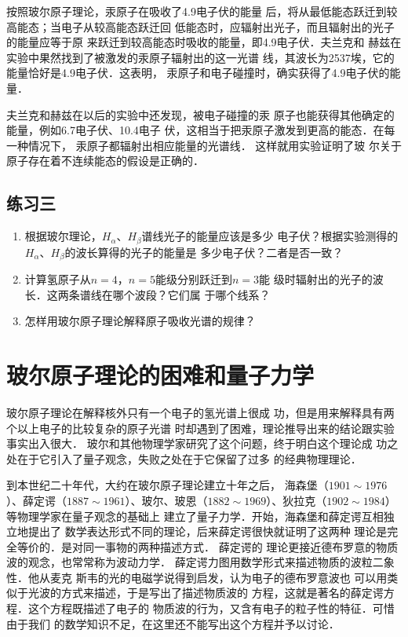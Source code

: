按照玻尔原子理论，汞原子在吸收了4.9电子伏的能量
后，将从最低能态跃迁到较高能态；当电子从较高能态跃迁回
低能态时，应辐射出光子，而且辐射出的光子的能量应等于原
来跃迁到较高能态时吸收的能量，即4.9电子伏．夫兰克和
赫兹在实验中果然找到了被激发的汞原子辐射出的这一光谱
线，其波长为2537埃，它的能量恰好是4.9电子伏．这表明，
汞原子和电子碰撞时，确实获得了4.9电子伏的能量．

夫兰克和赫兹在以后的实验中还发现，被电子碰撞的汞
原子也能获得其他确定的能量，例如6.7电子伏、10.4电子
伏，这相当于把汞原子激发到更高的能态．在每一种情况下，
汞原子都辐射出相应能量的光谱线．
这样就用实验证明了玻
尔关于原子存在着不连续能态的假设是正确的．


\subsection*{练习三}
\begin{enumerate}
    \item 根据玻尔理论，$H_{\alpha}$、$H_{\beta}$谱线光子的能量应该是多少
电子伏？根据实验测得的$H_{\alpha}$、$H_{\beta}$的波长算得的光子的能量是
多少电子伏？二者是否一致？
\item 计算氢原子从$n=4$，$n=5$能级分别跃迁到$n=3$能
级时辐射出的光子的波长．这两条谱线在哪个波段？它们属
于哪个线系？
\item 怎样用玻尔原子理论解释原子吸收光谱的规律？
\end{enumerate}


\section{玻尔原子理论的困难和量子力学}

玻尔原子理论在解释核外只有一个电子的氢光谱上很成
功，但是用来解释具有两个以上电子的比较复杂的原子光谱
时却遇到了困难，理论推导出来的结论跟实验事实出入很大．
玻尔和其他物理学家研究了这个问题，终于明白这个理论成
功之处在于它引入了量子观念，失败之处在于它保留了过多
的经典物理理论．

到本世纪二十年代，大约在玻尔原子理论建立十年之后，
海森堡（$1901 \sim 1976$）、薛定谔（$1887 \sim 1961$）、玻尔、玻恩（$1882
 \sim 1969$）、狄拉克（$1902 \sim 1984$）等物理学家在量子观念的基础上
建立了量子力学．开始，海森堡和薛定谔互相独立地提出了
数学表达形式不同的理论，后来薛定谔很快就证明了这两种
理论是完全等价的．是对同一事物的两种描述方式．
薛定谔的
理论更接近德布罗意的物质波的观念，也常常称为波动力学．
薛定谔力图用数学形式来描述物质的波粒二象性．他从麦克
斯韦的光的电磁学说得到启发，认为电子的德布罗意波也
可以用类似于光波的方式来描述，于是写出了描述物质波的
方程，这就是著名的薛定谔方程．这个方程既描述了电子的
物质波的行为，又含有电子的粒子性的特征．可惜由于我们
的数学知识不足，在这里还不能写出这个方程并予以讨论．


